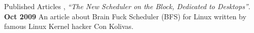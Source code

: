 \documentclass{resume}
\begin{document}

\begin{category}{Published Articles}
  , {\em ``The New Scheduler on the Block, Dedicated to Desktops''}. \hfill \textbf{Oct 2009}
  \citemnobullet An article about Brain Fuck Scheduler (BFS) for Linux written by famous Linux Kernel hacker Con Kolivas.
\end{category}
\end{document}
